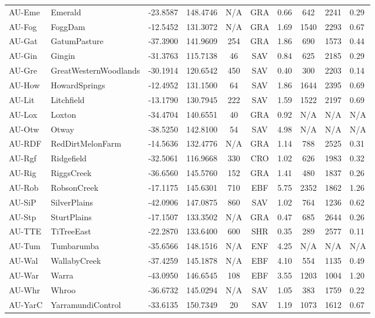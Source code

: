 \documentclass[11pt,a4paper]{article}
\begin{document}
\begin{longtable}{llccccccc}
AU-Eme & Emerald & -23.8587 & 148.4746 & N/A & GRA & 0.66 & 642 & 2241 & 0.29 \\
AU-Fog & FoggDam & -12.5452 & 131.3072 & N/A & GRA & 1.69 & 1540 & 2293 & 0.67 \\
AU-Gat & GatumPasture & -37.3900 & 141.9609 & 254 & GRA & 1.86 & 690 & 1573 & 0.44 \\
AU-Gin & Gingin & -31.3763 & 115.7138 & 46 & SAV & 0.84 & 625 & 2185 & 0.29 \\
AU-Gre & GreatWesternWoodlands & -30.1914 & 120.6542 & 450 & SAV & 0.40 & 300 & 2203 & 0.14 \\
AU-How & HowardSprings & -12.4952 & 131.1500 & 64 & SAV & 1.86 & 1644 & 2395 & 0.69 \\
AU-Lit & Litchfield & -13.1790 & 130.7945 & 222 & SAV & 1.59 & 1522 & 2197 & 0.69 \\
AU-Lox & Loxton & -34.4704 & 140.6551 & 40 & GRA & 0.92 & N/A & N/A & N/A \\
AU-Otw & Otway & -38.5250 & 142.8100 & 54 & SAV & 4.98 & N/A & N/A & N/A \\
AU-RDF & RedDirtMelonFarm & -14.5636 & 132.4776 & N/A & GRA & 1.14 & 788 & 2525 & 0.31 \\
AU-Rgf & Ridgefield & -32.5061 & 116.9668 & 330 & CRO & 1.02 & 626 & 1983 & 0.32 \\
AU-Rig & RiggsCreek & -36.6560 & 145.5760 & 152 & GRA & 1.41 & 480 & 1837 & 0.26 \\
AU-Rob & RobsonCreek & -17.1175 & 145.6301 & 710 & EBF & 5.75 & 2352 & 1862 & 1.26 \\
AU-SiP & SilverPlains & -42.0906 & 147.0875 & 860 & SAV & 1.02 & 764 & 1236 & 0.62 \\
AU-Stp & SturtPlains & -17.1507 & 133.3502 & N/A & GRA & 0.47 & 685 & 2644 & 0.26 \\
AU-TTE & TiTreeEast & -22.2870 & 133.6400 & 600 & SHR & 0.35 & 289 & 2577 & 0.11 \\
AU-Tum & Tumbarumba & -35.6566 & 148.1516 & N/A & ENF & 4.25 & N/A & N/A & N/A \\
AU-Wal & WallabyCreek & -37.4259 & 145.1878 & N/A & EBF & 4.10 & 554 & 1135 & 0.49 \\
AU-War & Warra & -43.0950 & 146.6545 & 108 & EBF & 3.55 & 1203 & 1004 & 1.20 \\
AU-Whr & Whroo & -36.6732 & 145.0294 & N/A & SAV & 1.05 & 383 & 1759 & 0.22 \\
AU-YarC & YarramundiControl & -33.6135 & 150.7349 & 20 & SAV & 1.19 & 1073 & 1612 & 0.67 \\

\end{longtable}
\end{document}
